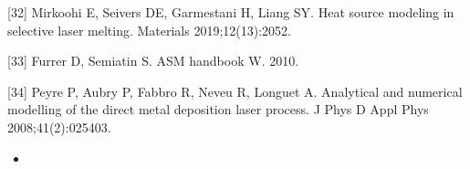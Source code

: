 \documentclass[10pt]{article}
\begin{document}
[32] Mirkoohi E, Seivers DE, Garmestani H, Liang SY. Heat source modeling in selective laser melting. Materials 2019;12(13):2052.

[33] Furrer D, Semiatin S. ASM handbook W. 2010.

[34] Peyre P, Aubry P, Fabbro R, Neveu R, Longuet A. Analytical and numerical modelling of the direct metal deposition laser process. J Phys D Appl Phys 2008;41(2):025403.

\begin{itemize}
  \item 
\end{itemize}
\end{document}
